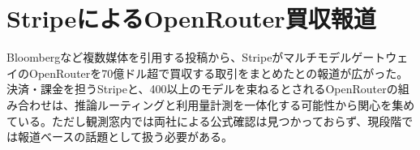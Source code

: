 \section{StripeによるOpenRouter買収報道}
Bloombergなど複数媒体を引用する投稿から、StripeがマルチモデルゲートウェイのOpenRouterを70億ドル超で買収する取引をまとめたとの報道が広がった。決済・課金を担うStripeと、400以上のモデルを束ねるとされるOpenRouterの組み合わせは、推論ルーティングと利用量計測を一体化する可能性から関心を集めている。ただし観測窓内では両社による公式確認は見つかっておらず、現段階では報道ベースの話題として扱う必要がある。
